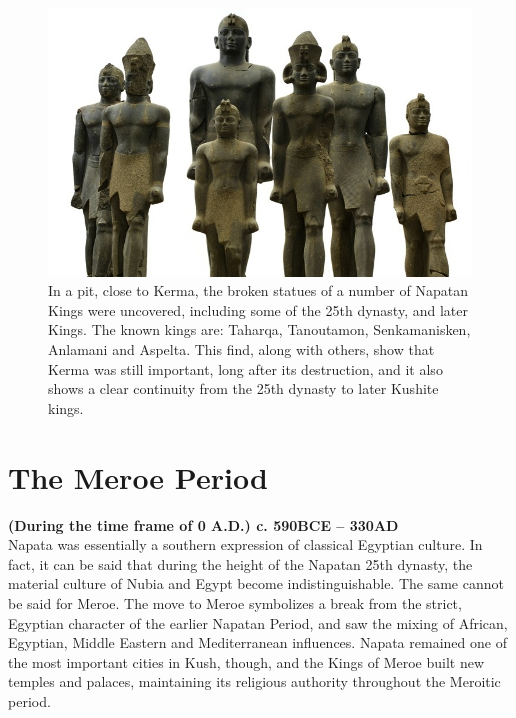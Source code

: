 \documentclass[a4paper,12pt]{scrreprt}
\begin{document}
\begin{figure}[H]
	\centering
	\includegraphics[width=\textwidth]{img/naptan_kings}
	\caption{In a pit, close to Kerma, the broken statues of a number of Napatan Kings were uncovered, including some of the 25th dynasty, and later Kings. The known kings are: Taharqa, Tanoutamon, Senkamanisken, Anlamani and Aspelta. This find, along with others, show that Kerma was still important, long after its destruction, and it also shows a clear continuity from the 25th dynasty to later Kushite kings.}
\end{figure}

\section{The Meroe Period}

\textbf{(During the time frame of 0 A.D.) c. 590BCE – 330AD}\\

Napata was essentially a southern expression of classical Egyptian culture. In fact, it can be said that during the height of the Napatan 25th dynasty, the material culture of Nubia and Egypt become indistinguishable. The same cannot be said for Meroe. The move to Meroe symbolizes a break from the strict, Egyptian character of the earlier Napatan Period, and saw the mixing of African, Egyptian, Middle Eastern and Mediterranean influences. Napata remained one of the most important cities in Kush, though, and the Kings of Meroe built new temples and palaces, maintaining its religious authority throughout the Meroitic period.
\end{document}
